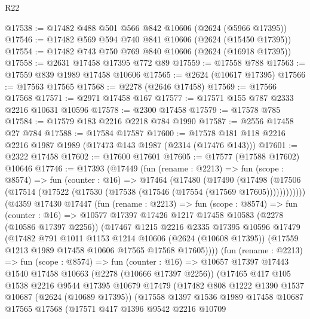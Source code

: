 \begin{lexlean}{R22}
\begin{coremodule}
@17538 := @17482 @488 @501 @566 @842 @10606 (@2624 (@5966 @17395))
@17546 := @17482 @569 @594 @740 @841 @10606 (@2624 (@15450 @17395))
@17554 := @17482 @743 @750 @769 @840 @10606 (@2624 (@16918 @17395))
@17558 := @2631 @17458 @17395 @772 @89
@17559 := @17558 @788
@17563 := @17559 @839 @1989 @17458 @10606
@17565 := @2624 (@10617 @17395)
@17566 := @17563 @17565
@17568 := @2278 (@2646 @17458)
@17569 := @17566 @17568
@17571 := @2971 @17458 @167
@17577 := @17571 @155 @787 @2333 @2216 @10631 @10596
@17578 := @2300 @17458
@17579 := @17578 @785
@17584 := @17579 @183 @2216 @2218 @784 @1990
@17587 := @2556 @17458 @27 @784
@17588 := @17584 @17587
@17600 := @17578 @181 @118 @2216 @2216 @1987 @1989 (@17473 @143 @1987 (@2314 (@17476 @143)))
@17601 := @2322 @17458
@17602 := @17600 @17601
@17605 := @17577 (@17588 @17602) @10646
@17746 := @17393
    (@17449
      (fun (rename : @2213) =>
      fun (scope : @8574) =>
      fun (counter : @16) =>
      @17464
        (@17480
          (@17490
            (@17498
              (@17506 (@17514 (@17522 (@17530 (@17538 (@17546 (@17554 (@17569 @17605))))))))))))
      (@4359
        @17430
        @17447
        (fun (rename : @2213) =>
        fun (scope : @8574) =>
        fun (counter : @16) =>
        @10577
          @17397
          @17426
          @1217
          @17458
          @10583
          (@2278 (@10586 @17397 @2256))
          (@17467
            @1215
            @2216
            @2335
            @17395
            @10596
            @17479
            (@17482
              @791
              @1011
              @1153
              @1214
              @10606
              (@2624 (@10608 @17395))
              (@17559 @1213 @1989 @17458 @10606 @17565 @17568 @17605))))
        (fun (rename : @2213) =>
        fun (scope : @8574) =>
        fun (counter : @16) =>
        @10657
          @17397
          @17443
          @1540
          @17458
          @10663
          (@2278 (@10666 @17397 @2256))
          (@17465
            @417
            @105
            @1538
            @2216
            @9544
            @17395
            @10679
            @17479
            (@17482
              @808
              @1222
              @1390
              @1537
              @10687
              (@2624 (@10689 @17395))
              (@17558
                @1397
                @1536
                @1989
                @17458
                @10687
                @17565
                @17568
                (@17571
                  @417
                  @1396
                  @9542
                  @2216
                  @10709

\end{coremodule}
\end{lexlean}
